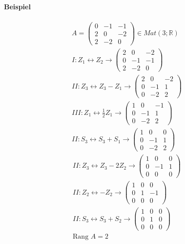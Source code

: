 \documentclass[11pt]{report}
\newcommand*\Zb[1] {\mathbb{#1}}
\begin{document}
\paragraph{Beispiel}
\begin{align}
A = \begin{pmatrix} 0 & -1 & -1 \\ 2 & 0 & -2 \\ 2 & -2 & 0 \end{pmatrix} \in Mat(3;\Zb{R})\\
I: Z_1 \leftrightarrow Z_2 \rightarrow \begin{pmatrix} 2 & 0 & -2 \\ 0 & -1 & -1 \\ 2 & -2 & 0 \end{pmatrix} \\
II: Z_3 \leftrightarrow Z_3-Z_1 \rightarrow \begin{pmatrix} 2 & 0 & -2 \\ 0 & -1 & 1 \\ 0 & -2 & 2 \end{pmatrix} \\
III: Z_1 \leftrightarrow \frac{1}{2} Z_1 \rightarrow \begin{pmatrix} 1 & 0 & -1 \\ 0 & -1 & 1 \\ 0 & -2 & 2 \end{pmatrix} \\
II: S_3 \leftrightarrow S_3 + S_1 \rightarrow \begin{pmatrix} 1 & 0 & 0 \\ 0 & -1 & 1 \\ 0 & -2 & 2 \end{pmatrix}
\end{align}
\begin{align}
II: Z_3 \leftrightarrow Z_3 - 2 Z_2 \rightarrow \begin{pmatrix} 1 & 0 & 0 \\ 0 & -1 & 1 \\ 0 & 0 & 0 \end{pmatrix} \\
II: Z_2 \leftrightarrow - Z_2 \rightarrow \begin{pmatrix} 1 & 0 & 0 \\ 0 & 1 & -1 \\ 0 & 0 & 0 \end{pmatrix} \\
II: S_3 \leftrightarrow S_3 + S_2 \rightarrow \begin{pmatrix} 1 & 0 & 0 \\ 0 & 1 & 0 \\ 0 & 0 & 0 \end{pmatrix} \\
\text{Rang } A = 2
\end{align}
\end{document}
